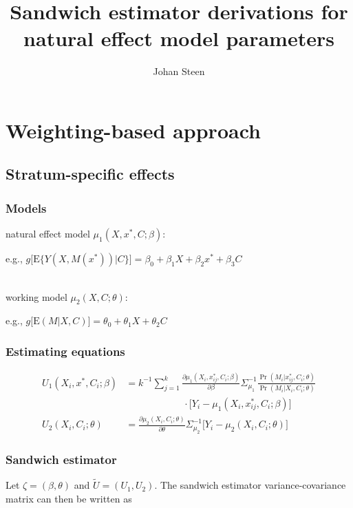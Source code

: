 \documentclass[]{article}
\title{Sandwich estimator derivations for natural effect model parameters}
\author{Johan Steen}
\begin{document}
\maketitle

\section*{Weighting-based approach}
     
\subsection*{Stratum-specific effects}

\subsubsection*{Models}
natural effect model $\mu_1(X,x^*,C;\beta)$:
\begin{flushright} e.g., $g\big[\textrm{E}\{Y(X,M(x^*))\vert C\}\big] = \beta_0 + \beta_1 X + \beta_2 x^* + \beta_3 C$\end{flushright}\\[1em]
working model $\mu_2(X,C;\theta)$:
\begin{flushright} e.g., $g\big[\textrm{E}(M\vert X,C)\big] = \theta_0 + \theta_1 X + \theta_2 C$\end{flushright}

\subsubsection*{Estimating equations}
\begin{align*}
\displaystyle U_{1}(X_i,x^*,C_i;\beta) &= k^{-1} \sum_{j=1}^{k} \frac{\partial \mu_1(X_i,x^*_{ij},C_i;\beta)}{\partial \beta} \Sigma_{\mu_1}^{-1} \frac{\Pr(M_i\vert x^*_{ij},C_i;\theta)}{\Pr(M_i\vert X_i,C_i;\theta)}\\[-0.6em] & \qquad \qquad \qquad \cdot \big[ Y_i - \mu_1(X_i,x^*_{ij},C_i;\beta) \big]\\[1em]
\displaystyle U_{2}(X_i,C_i;\theta) &= \frac{\partial \mu_2(X_i,C_i;\theta)}{\partial \theta} \Sigma_{\mu_2}^{-1} \big[ Y_i - \mu_2(X_i,C_i;\theta) \big]
\end{align*}

\subsubsection*{Sandwich estimator}

Let $\zeta = (\beta, \theta)$ and $\tilde U = (U_1, U_2)$. The sandwich estimator variance-covariance matrix can then be written as
\end{document}
